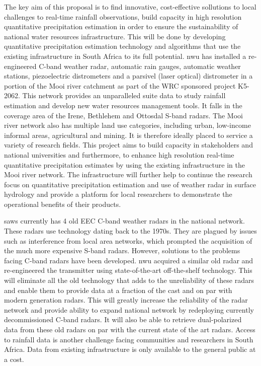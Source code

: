 \documentclass{wrcreport}
\begin{document}
The key aim of this proposal is to find innovative, cost-effective
sollutions to local challenges to real-time rainfall observations,
build capacity in high resolution quantitative precipitation
estimation in order to ensure the sustainability of national water
resources infrastructure. This will be done by developing quantitative
precipitation estimation technology and algorithms that use the
existing infrastructure in South Africa to its full potential.
\gls{nwu} has installed a re- engineered C-band weather radar,
automatic rain gauges, automatic weather stations, piezoelectric
distrometers and a parsivel (laser optical) distrometer in a portion
of the Mooi river catchment as part of the WRC sponsored project
K5-2062. This network provides an unparalleled suite data to study
rainfall estimation and develop new water resources management tools.
It falls in the coverage area of the Irene, Bethlehem and Ottosdal
S-band radars. The Mooi river network also has multiple land use
categories, including urban, low-income informal areas, agricultural
and mining. It is therefore ideally placed to service a variety of
research fields. This project aims to build capacity in stakeholders
and national universities and furthermore, to enhance high resolution
real-time quantitative precipitation estimates by using the existing
infrastructure in the Mooi river network. The infrastructure will
further help to continue the research focus on quantitative
precipitation estimation and use of weather radar in surface hydrology
and provide a platform for local researchers to demonstrate the
operational benefits of their products.

\gls{saws} currently has 4 old EEC C-band weather radars in the
national network. These radars use technology dating back to the
1970s. They are plagued by issues such as interference from local area
networks, which prompted the acquisition of the much more expensive
S-band radars. However, solutions to the problems facing C-band
radars have been developed. \gls{nwu} acquired a similar old radar and
re-engineered the transmitter using state-of-the-art off-the-shelf
technology. This will eliminate all the old technology that adds to
the unreliability of these radars and enable them to provide data at a
fraction of the cast and on par with modern generation radars. This
will greatly increase the reliability of the radar network and provide
ability to expand national network by redeploying currently
decommissioned C-band radars. It will also be able to retrieve
dual-polarized data from these old radars on par with the current
state of the art radars. Access to rainfall data is another challenge
facing communities and researchers in South Africa. Data from existing
infrastructure is only available to the general public at a cost.
\end{document}
